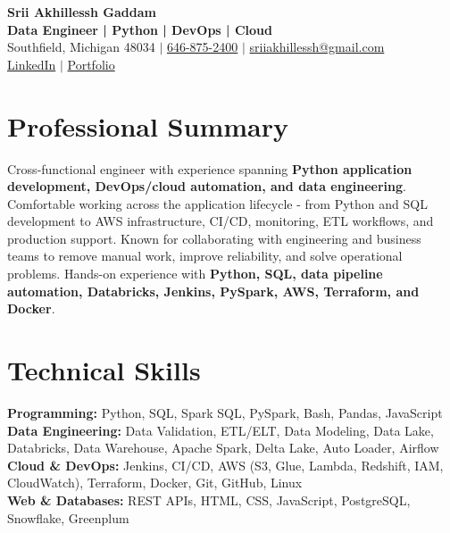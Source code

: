 \documentclass[letterpaper,10pt]{article}
\begin{document}
\fontsize{9.35pt}{10.45pt}\selectfont

\begin{center}
    {\LARGE \textbf{Srii Akhillessh Gaddam}} \\[-1pt]
    \textbf{Data Engineer | Python | DevOps | Cloud} \\[2pt]
    Southfield, Michigan 48034 $|$
    \href{tel:6468752400}{646-875-2400} $|$
    \href{mailto:sriiakhillessh@gmail.com}{sriiakhillessh@gmail.com} \\[1pt]
    \href{https://www.linkedin.com/in/srii-akhiilessh-gaddam-b48668191/}{LinkedIn} $|$
    \href{https://sriiakhillesshg.github.io/portfolio/}{Portfolio}
\end{center}
\vspace{-8pt}

\section{Professional Summary}
\small{Cross-functional engineer with experience spanning \textbf{Python application development, DevOps/cloud automation, and data engineering}. Comfortable working across the application lifecycle - from Python and SQL development to AWS infrastructure, CI/CD, monitoring, ETL workflows, and production support. Known for collaborating with engineering and business teams to remove manual work, improve reliability, and solve operational problems. Hands-on experience with \textbf{Python, SQL, data pipeline automation, Databricks, Jenkins, PySpark, AWS, Terraform, and Docker}.}

\section{Technical Skills}
\small{
\textbf{Programming:} Python, SQL, Spark SQL, PySpark, Bash, Pandas, JavaScript \\
\textbf{Data Engineering:} Data Validation, ETL/ELT, Data Modeling, Data Lake, Databricks, Data Warehouse, Apache Spark, Delta Lake, Auto Loader, Airflow \\
\textbf{Cloud \& DevOps:} Jenkins, CI/CD, AWS (S3, Glue, Lambda, Redshift, IAM, CloudWatch), Terraform, Docker, Git, GitHub, Linux \\
\textbf{Web \& Databases:} REST APIs, HTML, CSS, JavaScript, PostgreSQL, Snowflake, Greenplum
}
\end{document}
